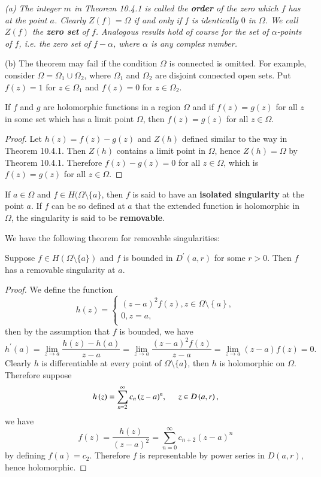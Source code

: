 \begin{note}\em
(a) The integer $m$ in Theorem 10.4.1 is called the \textbf{order} of the zero which $f$ has at the point $a$. Clearly $Z(f)=\Omega$ if and only if $f$ is identically $0$ in $\Omega$. We call $Z(f)$ the \textbf{zero set} of $f$. Analogous results hold of course for the set of $\alpha$-points of $f$, i.e. the zero set of $f-\alpha$, where $\alpha$ is any complex number.\par
(b) The theorem may fail if the condition $\Omega$ is connected is omitted. For example, consider $\Omega=\Omega_1\cup\Omega_2$, where $\Omega_1$ and $\Omega_2$ are disjoint connected open sets. Put $f(z)=1$ for $z\in\Omega_1$ and $f(z)=0$ for $z\in\Omega_2$.
\end{note}
\begin{corollary}
If $f$ and $g$ are holomorphic functions in a region $\Omega$ and if $f(z)=g(z)$ for all $z$ in some set which has a limit point $\Omega$, then $f(z)=g(z)$ for all $z\in\Omega$.
\end{corollary}
\begin{proof}
Let $h(z)=f(z)-g(z)$ and $Z(h)$ defined similar to the way in Theorem 10.4.1. Then $Z(h)$ contains a limit point in $\Omega$, hence $Z(h)=\Omega$ by Theorem 10.4.1. Therefore $f(z)-g(z)=0$ for all $z\in\Omega$, which is $f(z)=g(z)$ for all $z\in\Omega$.
\end{proof}
\begin{definition}
If $a\in\Omega$ and $f\in H(\Omega\setminus\{a\}$, then $f$ is said to have an \textbf{isolated singularity} at the point $a$. If $f$ can be so defined at $a$ that the extended function is holomorphic in $\Omega$, the singularity is said to be \textbf{removable}.
\end{definition}
We have the following theorem for removable singularities:
\begin{theorem}
Suppose $f\in H(\Omega\setminus\{a\})$ and $f$ is bounded in $D^\prime(a,r)$ for some $r>0$. Then $f$ has a removable singularity at $a$.
\end{theorem}
\begin{proof}
We define the function 
$$
h\left( z \right) =\begin{cases}
	\left( z-a \right) ^2f\left( z \right) ,z\in \Omega \setminus \left\{ a \right\} ,\\
	0,z=a,\\
\end{cases}
$$
then by the assumption that $f$ is bounded, we have 
$$
h^{\prime}\left( a \right) =\lim_{z\rightarrow a} \frac{h\left( z \right) -h\left( a \right)}{z-a}=\lim_{z\rightarrow a} \frac{\left( z-a \right) ^2f\left( z \right)}{z-a}=\lim_{z\rightarrow a} \left( z-a \right) f\left( z \right) =0.
$$
Clearly $h$ is differentiable at every point of $\Omega\setminus\{a\}$, then $h$ is holomorphic on $\Omega$. Therefore suppose 
$$
h\left( z \right) =\sum_{n=2}^{\infty}{c_n\left( z-a \right) ^n},\hspace{0.5cm}z\in D\left( a,r \right) ,
$$
we have 
$$
f\left( z \right) =\frac{h\left( z \right)}{\left( z-a \right) ^2}=\sum_{n=0}^{\infty}{c_{n+2}\left( z-a \right) ^n}
$$
by defining $f(a)=c_2$. Therefore $f$ is representable by power series in $D(a,r)$, hence holomorphic.
\end{proof}
